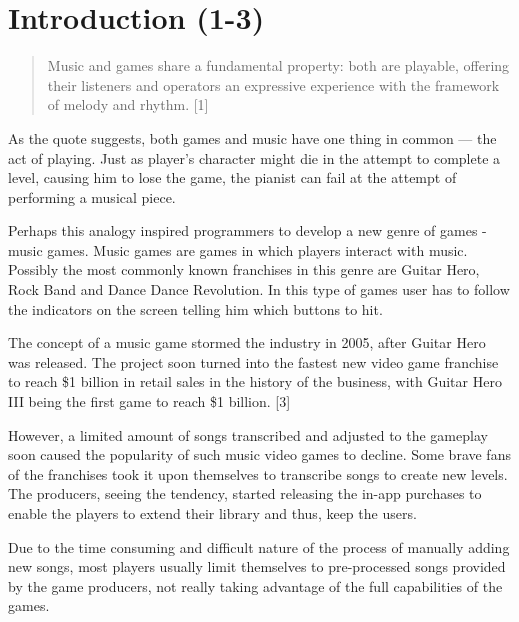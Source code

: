 
\chapter{Introduction (1-3)} %

\label{Chapter1} %



\begin{quotation}Music and games share a fundamental property: both are playable, offering their listeners and operators an expressive experience with the framework of melody and rhythm. [1]
\end{quotation} 

As the quote suggests, both games and music have one thing in common — the act of playing. Just as player’s character might die in the attempt to complete a level, causing him to lose the game, the pianist can fail at the attempt of performing a musical piece. 

Perhaps this analogy inspired programmers to develop a new genre of games - music games. Music games are games in which players interact with music. Possibly the most commonly known franchises in this genre are Guitar Hero, Rock Band and Dance Dance Revolution. In this type of games user has to follow the indicators on the screen telling him which buttons to hit. 

The concept of a music game stormed the industry in 2005, after Guitar Hero was released. The project soon turned into the fastest new video game franchise to reach \$1 billion in retail sales in the history of the business, with Guitar Hero III being the first game to reach \$1 billion. [3]

However, a limited amount of songs transcribed and adjusted to the gameplay soon caused the popularity of such music video games to decline. Some brave fans of the franchises took it upon themselves to transcribe songs to create new levels. The producers, seeing the tendency, started releasing the in-app purchases to enable the players to extend their library and thus, keep the users. 

Due to the time consuming and difficult nature of the process of manually adding new songs, most players usually limit themselves to pre-processed songs provided by the game producers, not really taking advantage of the full capabilities of the games. 

